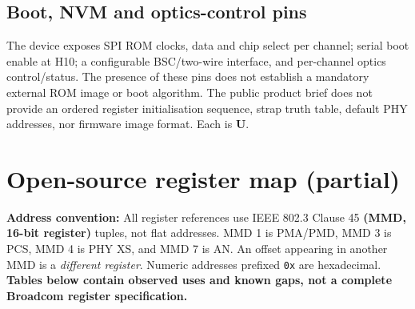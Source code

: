 \documentclass[10pt,a4paper]{article}
\newcommand{\unk}{\textsf{\color{amber}\bfseries U}}
\begin{document}
\subsection{Boot, NVM and optics-control pins}
The device exposes SPI ROM clocks, data and chip select per channel; serial boot enable at H10; a configurable BSC/two-wire interface, and per-channel optics control/status. The presence of these pins does not establish a mandatory external ROM image or boot algorithm. The public product brief does not provide an ordered register initialisation sequence, strap truth table, default PHY addresses, nor firmware image format. Each is \unk.

\section{Open-source register map (partial)}
\label{sec:register-map}
\textbf{Address convention:} All register references use IEEE 802.3 Clause 45 \textbf{(MMD, 16-bit register)} tuples, not flat addresses. MMD 1 is PMA/PMD, MMD 3 is PCS, MMD 4 is PHY XS, and MMD 7 is AN. An offset appearing in another MMD is a \emph{different register}. Numeric addresses prefixed \texttt{0x} are hexadecimal. \textbf{Tables below contain observed uses and known gaps, not a complete Broadcom register specification.}
\end{document}
